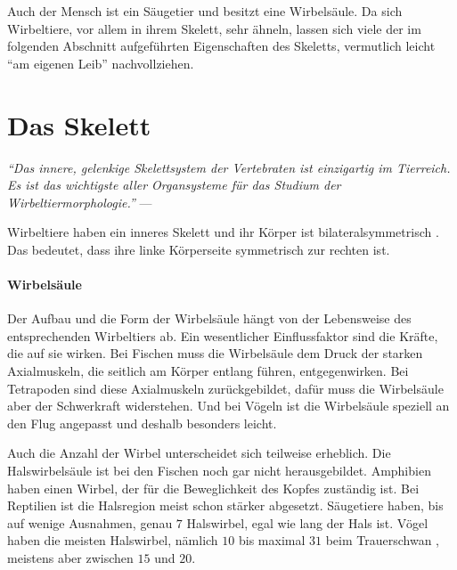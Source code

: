 Auch der Mensch ist ein Säugetier und besitzt eine Wirbelsäule. Da sich Wirbeltiere, vor allem in ihrem Skelett, sehr ähneln, lassen sich viele der im folgenden Abschnitt aufgeführten Eigenschaften des Skeletts, vermutlich leicht "`am eigenen Leib"' nachvollziehen.


\newpage
\section{Das Skelett}
\label{biology_skeleton}

\vspace{0.5cm}
\begin{center}
 \begin{minipage}{12cm}
  \emph{"`Das innere, gelenkige Skelettsystem der Vertebraten ist einzigartig im Tierreich. Es ist das wichtigste aller Organsysteme für das Studium der Wirbeltiermorphologie."'}
  --- \cite[S.\ 131]{Vergleichende_Anatomie}
 \end{minipage}
\end{center}


Wirbeltiere haben ein inneres Skelett und ihr Körper ist bilateralsymmetrisch \cite[S.\ 27]{Vergleichende_Anatomie}. Das bedeutet, dass ihre linke Körperseite symmetrisch zur rechten ist. 

\paragraph{Wirbelsäule}
Der Aufbau und die Form der Wirbelsäule hängt von der Lebensweise des entsprechenden Wirbeltiers ab. Ein wesentlicher Einflussfaktor sind die Kräfte, die auf sie wirken. 
Bei Fischen muss die Wirbelsäule dem Druck der starken Axialmuskeln, die seitlich am Körper entlang führen, entgegenwirken.
Bei Tetrapoden sind diese Axialmuskeln zurückgebildet, dafür muss die Wirbelsäule aber der Schwerkraft widerstehen.
Und bei Vögeln ist die Wirbelsäule speziell an den Flug angepasst und deshalb \ua besonders leicht. \cite[\mbox{Abschnitt 9.2}, S.\ 168 ff.]{Vergleichende_Anatomie}

Auch die Anzahl der Wirbel unterscheidet sich teilweise erheblich. 
Die Halswirbelsäule ist \zb bei den Fischen noch gar nicht herausgebildet. Amphibien haben einen Wirbel, der für die Beweglichkeit des Kopfes zuständig ist. Bei Reptilien ist die Halsregion meist schon stärker abgesetzt. Säugetiere haben, bis auf wenige Ausnahmen, genau $7$ Halswirbel, egal wie lang der Hals ist. Vögel haben die meisten Halswirbel, nämlich $10$ bis maximal $31$ beim Trauerschwan \cite{WikipediaVogelskelett}, meistens aber zwischen $15$ und $20$. \cite[Abschnitt 9.2]{Vergleichende_Anatomie}

